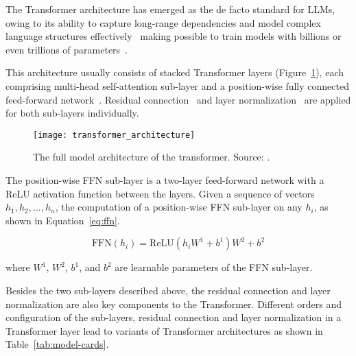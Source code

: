 The Transformer architecture has emerged as the de facto standard for LLMs, owing to its ability to capture long-range dependencies and model complex language structures effectively~\cite{vaswani2023attention} making possible to train models with billions or even trillions of parameters~\cite{brown2020language, touvron2023llama}.

This architecture usually consists of stacked Transformer layers (Figure~\ref{fig:architecture}), each comprising multi-head self-attention sub-layer and a position-wise fully connected feed-forward network~\cite{vaswani2023attention}.
Residual connection~\cite{he2016deep} and layer normalization~\cite{ba2016layer} are applied for both sub-layers individually.

\begin{figure}[H]
	\centering
	\texttt{[image: transformer\_architecture]}
	\caption{The full model architecture of the transformer. Source: \textcite{weng2018attention}.}
	\label{fig:architecture}
\end{figure}

The position-wise FFN sub-layer is a two-layer feed-forward network with a ReLU activation function between the layers.
Given a sequence of vectors \(h_1, h_2, \ldots, h_n\), the computation of a position-wise FFN sub-layer on any \(h_i\), as shown in Equation~\ref{eq:ffn}.

\begin{equation}
	\text{FFN}(h_i) = \text{ReLU}(h_{i}W^1 + b^1)W^2 + b^2
	\label{eq:ffn}
\end{equation}

\noindent where \(W^1\), \(W^2\), \(b^1\), and \(b^2\) are learnable parameters of the FFN sub-layer.

Besides the two sub-layers described above, the residual connection and layer normalization are also key components to the
Transformer.
Different orders and configuration of the sub-layers, residual connection and layer normalization in a Transformer layer lead to variants of Transformer architectures as shown in Table~\ref{tab:model-cards}.

